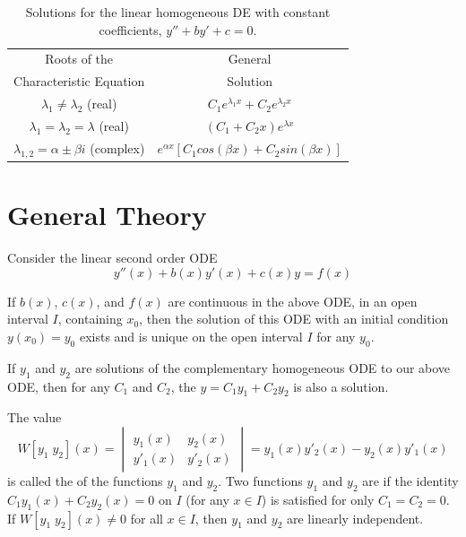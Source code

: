 \documentclass[12pt, a4paper, oneside, openright, titlepage]{book}
\begin{document}
\bgroup
\def\arraystretch{1.5}
\begin{table}[H]
        \centering
        \caption{Solutions for the linear homogeneous DE with constant coefficients, $y'' + by' + c = 0$.}
        \begin{tabular}{c|c}
                Roots of the & General \\ 
                Characteristic Equation & Solution \\ \hline
                $\lambda_1 \neq \lambda_2$ (real) & $C_1e^{\lambda_1 x}+C_2e^{\lambda_2 x}$ \\
                $\lambda_1 = \lambda_2 = \lambda$ (real) & $(C_1+C_2x)e^{\lambda x}$ \\
                $\lambda_{1,2} = \alpha \pm \beta i$ (complex) & $e^{\alpha x}[C_1cos(\beta x) + C_2sin(\beta x)]$ \\
        \end{tabular}
\end{table}
\egroup





\section{General Theory}

Consider the linear second order ODE \begin{equation}
        y''(x)+b(x)y'(x)+c(x)y=f(x)
\end{equation}


\begin{thm}
         If $b(x)$, $c(x)$, and $f(x)$ are continuous in the above ODE, in an open interval $I$, containing $x_0$, then the solution of this ODE with an initial condition $y(x_0) = y_0$ exists and is unique on the open interval $I$ for any $y_0$.
\end{thm}



\begin{thm}
        If $y_1$ and $y_2$ are solutions of the complementary homogeneous ODE to our above ODE, then for any $C_1$ and $C_2$, the  $y = C_1y_1+C_2y_2$ is also a solution.
\end{thm}




\begin{defn}[Wronskian]
        The value \begin{equation}
                W[y_1\;y_2](x) = \begin{vmatrix}y_1(x) & y_2(x) \\
                y'_1(x) & y'_2(x) \end{vmatrix} = y_1(x)y'_2(x) - y_2(x)y'_1(x) 
        \end{equation}
        is called the  of the functions $y_1$ and $y_2$. Two functions $y_1$ and $y_2$ are  if the identity $C_1y_1(x) + C_2y_2(x) = 0$ on $I$ (for any $x \in I$) is satisfied for only $C_1 = C_2 = 0$. If $W[y_1\;y_2](x)\neq 0$ for all $x \in I$, then $y_1$ and $y_2$ are linearly independent.
\end{defn}
\end{document}
